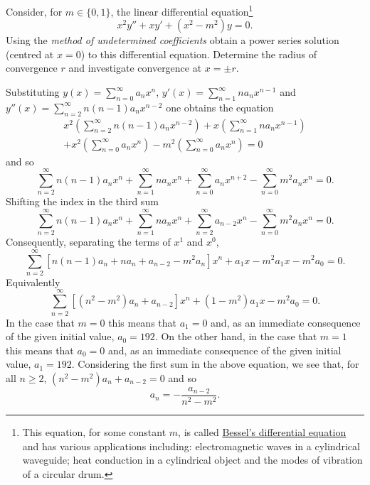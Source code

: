 \begin{task}
    Consider, for \(m\in \{0,1\}\), the linear differential equation\footnote{This equation, for some constant \(m\), is called \href{https://en.wikipedia.org/wiki/Bessel_function}{Bessel's differential equation} and has various applications including: electromagnetic waves in a cylindrical waveguide; heat conduction in a cylindrical object and the modes of vibration of a circular drum.}
    \[
        x^2y'' + xy' + (x^2-m^2) y = 0.
    \]
    Using the \emph{method of undetermined coefficients} obtain a power series solution (centred at \(x=0\)) to this differential equation.
    Determine the radius of convergence \(r\) and investigate convergence at \(x = \pm r\).
\end{task}

\begin{solution}
    Substituting \(y(x) = \sum_{n=0}^{\infty} a_n x^n\), \(y'(x) = \sum_{n=1}^{\infty} n a_n x^{n-1}\) and \(y''(x) = \sum_{n=2}^{\infty} n(n-1) a_n x^{n-2}\) one obtains the equation
    \begin{multline*}
        x^2 \left(\sum_{n=2}^{\infty} n(n-1) a_n x^{n-2}\right) + x \left(\sum_{n=1}^{\infty} n a_n x^{n-1}\right) \\ + x^2 \left(\sum_{n=0}^{\infty} a_n x^n\right) - m^2 \left(\sum_{n=0}^{\infty} a_n x^n\right) = 0
    \end{multline*}
    and so
    \[
        \sum_{n=2}^{\infty} n(n-1) a_n x^{n} + \sum_{n=1}^{\infty} n a_n x^{n} + \sum_{n=0}^{\infty} a_n x^{n+2} -  \sum_{n=0}^{\infty} m^2 a_n x^n = 0.
    \]
    Shifting the index in the third sum
    \[
        \sum_{n=2}^{\infty} n(n-1) a_n x^{n} + \sum_{n=1}^{\infty} n a_n x^{n} + \sum_{n=2}^{\infty} a_{n-2} x^{n} -  \sum_{n=0}^{\infty} m^2 a_n x^n = 0.
    \]
    Consequently, separating the terms of \(x^1\) and \(x^0\),
    \[
        \sum_{n=2}^{\infty}  \left[ n(n-1)a_n + n a_n +  a_{n-2} -m^2a_n  \right] x^{n} + a_1 x - m^2 a_1 x - m^2 a_0  =0.
    \]
    Equivalently
    \[
        \sum_{n=2}^{\infty}  \left[ (n^2 - m^2)a_n +  a_{n-2}   \right] x^{n} + (1 - m^2 )a_1 x - m^2 a_0  =0.
    \]
    In the case that \(m=0\) this means that \(a_1 = 0\) and, as an immediate consequence of the given initial value, \(a_0 = 192\).
    On the other hand, in the case that \(m=1\) this means that \(a_0=0\) and, as an immediate consequence of the given initial value, \(a_1 = 192\).
    Considering the first sum in the above equation, we see that, for all \(n\geq 2\),  \( (n^2 - m^2)a_n +  a_{n-2}  = 0 \) and so
    \[
        a_n = - \frac{a_{n-2}}{n^2 - m^2}.
\]
\end{solution}
